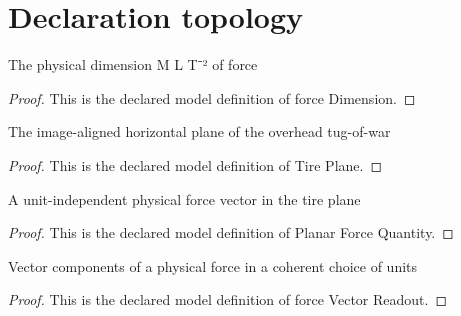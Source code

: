 \section{Declaration topology}
\begin{definition}
  \label{def:physics:phyx-mini-0756:phyxminiproblems-problemphyxmini0756-forcedimension}
  The physical dimension M L T⁻² of force
\end{definition}
\begin{proof}
  This is the declared model definition of force Dimension.
\end{proof}
\begin{definition}
  \label{def:physics:phyx-mini-0756:phyxminiproblems-problemphyxmini0756-tireplane}
  The image-aligned horizontal plane of the overhead tug-of-war
\end{definition}
\begin{proof}
  This is the declared model definition of Tire Plane.
\end{proof}
\begin{definition}
  \label{def:physics:phyx-mini-0756:phyxminiproblems-problemphyxmini0756-planarforcequantity}
  A unit-independent physical force vector in the tire plane
\end{definition}
\begin{proof}
  This is the declared model definition of Planar Force Quantity.
\end{proof}
\begin{definition}
  \label{def:physics:phyx-mini-0756:phyxminiproblems-problemphyxmini0756-forcevectorreadout}
  Vector components of a physical force in a coherent choice of units
\end{definition}
\begin{proof}
  This is the declared model definition of force Vector Readout.
\end{proof}
